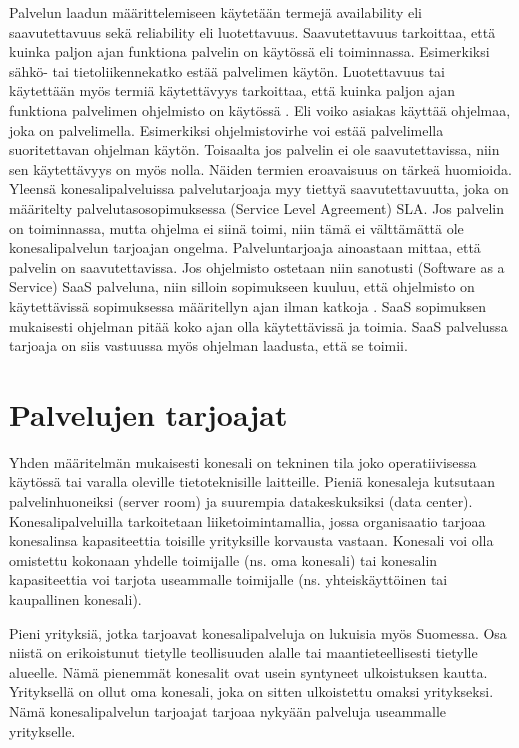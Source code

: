 Palvelun laadun määrittelemiseen käytetään termejä availability eli saavutettavuus sekä reliability eli luotettavuus. Saavutettavuus tarkoittaa, että kuinka paljon ajan funktiona palvelin on käytössä eli toiminnassa. Esimerkiksi sähkö- tai tietoliikennekatko estää palvelimen käytön. Luotettavuus tai käytettään myös termiä käytettävyys tarkoittaa, että kuinka paljon ajan funktiona palvelimen ohjelmisto on käytössä \citep{service_availability} \citep{itil}. Eli voiko asiakas käyttää ohjelmaa, joka on palvelimella. Esimerkiksi ohjelmistovirhe voi estää palvelimella suoritettavan ohjelman käytön. Toisaalta jos palvelin ei ole saavutettavissa, niin sen käytettävyys on myös nolla. Näiden termien eroavaisuus on tärkeä huomioida. Yleensä konesalipalveluissa palvelutarjoaja myy tiettyä saavutettavuutta, joka on määritelty palvelutasosopimuksessa (Service Level Agreement) SLA. Jos palvelin on toiminnassa, mutta ohjelma ei siinä toimi, niin tämä ei välttämättä ole konesalipalvelun tarjoajan ongelma. Palveluntarjoaja ainoastaan mittaa, että palvelin on saavutettavissa. Jos ohjelmisto ostetaan niin sanotusti (Software as a Service) SaaS palveluna, niin silloin sopimukseen kuuluu, että ohjelmisto on käytettävissä sopimuksessa määritellyn ajan ilman katkoja \citep{software_service}. SaaS sopimuksen mukaisesti ohjelman pitää koko ajan olla käytettävissä ja toimia. SaaS palvelussa tarjoaja on siis vastuussa myös ohjelman laadusta, että se toimii.

\section{Palvelujen tarjoajat}
Yhden määritelmän mukaisesti konesali on tekninen tila joko operatiivisessa käytössä tai varalla oleville tietoteknisille laitteille. Pieniä konesaleja kutsutaan palvelinhuoneiksi (server room) ja suurempia datakeskuksiksi (data center). Konesalipalveluilla tarkoitetaan liiketoimintamallia, jossa organisaatio tarjoaa konesalinsa kapasiteettia toisille yrityksille korvausta vastaan. Konesali voi olla omistettu kokonaan yhdelle toimijalle (ns. oma konesali) tai konesalin kapasiteettia voi tarjota useammalle toimijalle (ns. yhteiskäyttöinen tai kaupallinen konesali).\citep{itewiki}

Pieni yrityksiä, jotka tarjoavat konesalipalveluja on lukuisia myös Suomessa. Osa niistä on erikoistunut tietylle teollisuuden alalle tai maantieteellisesti tietylle alueelle. Nämä pienemmät konesalit ovat usein syntyneet ulkoistuksen kautta. Yrityksellä on ollut oma konesali, joka on sitten ulkoistettu omaksi yritykseksi. Nämä konesalipalvelun tarjoajat tarjoaa nykyään palveluja useammalle yritykselle.\citep{tnnet} 

